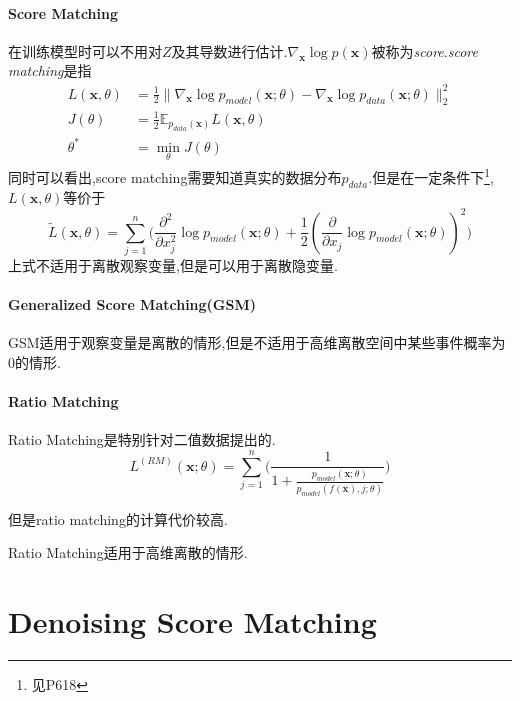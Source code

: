 \paragraph{Score Matching}在训练模型时可以不用对$Z$及其导数进行估计.$\nabla_{\mathbf x}\log p(\mathbf x)$被称为\textit{score}.\textit{score matching}是指
\begin{equation}\begin{split}
L(\mathbf x,\theta)&=\frac{1}{2}\|\nabla_{\mathbf x}\log p_{model}(\mathbf x;\theta)-\nabla_{\mathbf x}\log p_{data}(\mathbf x;\theta)\|_2^2\\
J(\theta)&=\frac{1}{2}\mathbb E_{p_{data}(\mathbf x)}L(\mathbf x,\theta)\\
\theta^\ast&=\min_\theta J(\theta)
\end{split}\end{equation}
同时可以看出,score matching需要知道真实的数据分布$p_{data}$.但是在一定条件下\footnote{见P618},$L(\mathbf x,\theta)$等价于
\begin{equation}
\tilde L(\mathbf x,\theta)=\sum_{j=1}^n\Big(\frac{\partial^2}{\partial x_j^2}\log p_{model}(\mathbf x;\theta)+\frac{1}{2}(\frac{\partial}{\partial x_j}\log p_{model}(\mathbf x;\theta))^2\Big)
\end{equation}
上式不适用于离散观察变量,但是可以用于离散隐变量.

\paragraph{Generalized Score Matching(GSM)}GSM适用于观察变量是离散的情形,但是不适用于高维离散空间中某些事件概率为$0$的情形.

\paragraph{Ratio Matching} Ratio Matching是特别针对二值数据提出的.
\begin{equation}
L^{(RM)}(\mathbf x;\theta)=\sum_{j=1}^n\Big(\frac{1}{1+\frac{p_{model}(\mathbf x;\theta)}{p_{model}(f(\mathbf x), j;\theta)}}\Big)
\end{equation}

但是ratio matching的计算代价较高.

Ratio Matching适用于高维离散的情形.

\section{Denoising Score Matching}

